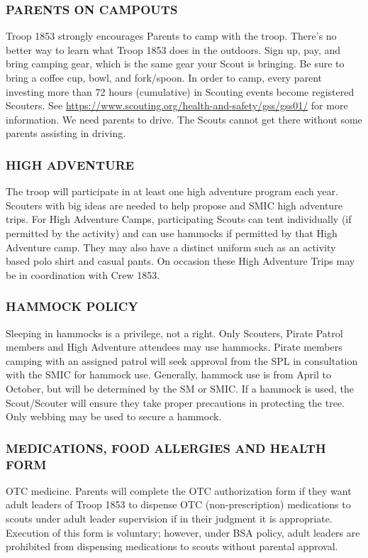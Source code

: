 \documentclass{ltxguide}
\begin{document}
\subsubsection{PARENTS ON CAMPOUTS}
Troop 1853 strongly encourages Parents to camp with the troop. There's no better way to learn what Troop 1853 does in the outdoors. Sign up, pay, and bring camping gear, which is the same gear your Scout is bringing. Be sure to bring a coffee cup, bowl, and fork/spoon. In order to camp, every parent investing more than 72 hours (cumulative) in Scouting events become registered Scouters. See \url{https://www.scouting.org/health-and-safety/gss/gss01/} for more information. We need parents to drive. The Scouts cannot get there without some parents assisting in driving.

\subsubsection{HIGH ADVENTURE}
The troop will participate in at least one high adventure program each year. Scouters with big ideas are needed to help propose and SMIC high adventure trips. For High Adventure Camps, participating Scouts can tent individually (if permitted by the activity) and can use hammocks if permitted by that High Adventure camp. They may also have a distinct uniform such as an activity based polo shirt and casual pants. On occasion these High Adventure Trips may be in coordination with Crew 1853.

\subsubsection{HAMMOCK POLICY}
Sleeping in hammocks is a privilege, not a right. Only Scouters, Pirate Patrol members and High Adventure attendees may use hammocks. Pirate members camping with an assigned patrol will seek approval from the SPL in consultation with the SMIC for hammock use. Generally, hammock use is from April to October, but will be determined by the SM or SMIC. If a hammock is used, the Scout/Scouter will ensure they take proper precautions in protecting the tree. Only webbing may be used to secure a hammock.

\subsubsection{MEDICATIONS, FOOD ALLERGIES AND HEALTH FORM}
\ac{OTC} medicine. Parents will complete the OTC authorization form if they want adult leaders of Troop 1853 to dispense \ac{OTC} (non-prescription) medications to scouts under adult leader supervision if in their judgment it is appropriate. Execution of this form is voluntary; however, under \ac{BSA} policy, adult leaders are prohibited from dispensing medications to scouts without parental approval.
\end{document}
